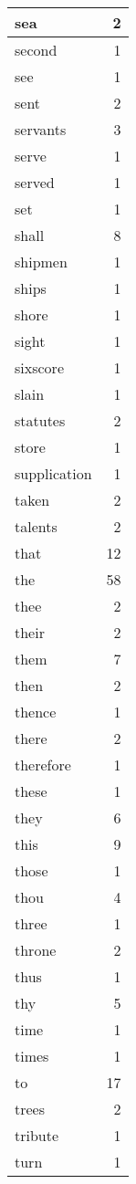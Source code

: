 \begin{center}
\begin{longtable}{l|r}
sea & 2 \\ \hline
second & 1 \\ \hline
see & 1 \\ \hline
sent & 2 \\ \hline
servants & 3 \\ \hline
serve & 1 \\ \hline
served & 1 \\ \hline
set & 1 \\ \hline
shall & 8 \\ \hline
shipmen & 1 \\ \hline
ships & 1 \\ \hline
shore & 1 \\ \hline
sight & 1 \\ \hline
sixscore & 1 \\ \hline
slain & 1 \\ \hline
statutes & 2 \\ \hline
store & 1 \\ \hline
supplication & 1 \\ \hline
taken & 2 \\ \hline
talents & 2 \\ \hline
that & 12 \\ \hline
the & 58 \\ \hline
thee & 2 \\ \hline
their & 2 \\ \hline
them & 7 \\ \hline
then & 2 \\ \hline
thence & 1 \\ \hline
there & 2 \\ \hline
therefore & 1 \\ \hline
these & 1 \\ \hline
they & 6 \\ \hline
this & 9 \\ \hline
those & 1 \\ \hline
thou & 4 \\ \hline
three & 1 \\ \hline
throne & 2 \\ \hline
thus & 1 \\ \hline
thy & 5 \\ \hline
time & 1 \\ \hline
times & 1 \\ \hline
to & 17 \\ \hline
trees & 2 \\ \hline
tribute & 1 \\ \hline
turn & 1 \\ \hline

\end{longtable}
\end{center}
